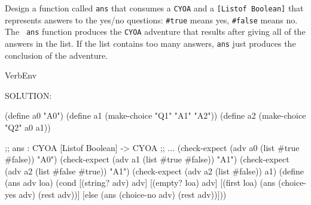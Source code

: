 \documentclass[12pt]{article}
\begin{document}
\noindent
Design a function called {\tt ans} that consumes a {\tt CYOA} and a
{\tt [Listof Boolean]} that represents answers to the yes/no
questions: {\tt \#true} means yes, {\tt \#false} means no.  The {\tt
  ans} function produces the {\tt CYOA} adventure that results after
giving all of the answers in the list.  If the list contains too many
answers, {\tt ans} just produces the conclusion of the adventure.


\begin{SaveVerbatim}{VerbEnv}

SOLUTION:

(define a0 "A0")
(define a1 (make-choice "Q1" "A1" "A2"))
(define a2 (make-choice "Q2" a0 a1))

;; ans : CYOA [Listof Boolean] -> CYOA
;; ...
(check-expect (adv a0 (list #true #false)) "A0")
(check-expect (adv a1 (list #true #false)) "A1")
(check-expect (adv a2 (list #false #true)) "A1")
(check-expect (adv a2 (list #false)) a1)
(define (ans adv loa)
  (cond [(string? adv) adv]
        [(empty? loa) adv]
        [(first loa)
         (ans (choice-yes adv) (rest adv))]
        [else
         (ans (choice-no adv) (rest adv))]))
\end{SaveVerbatim}

\end{document}

